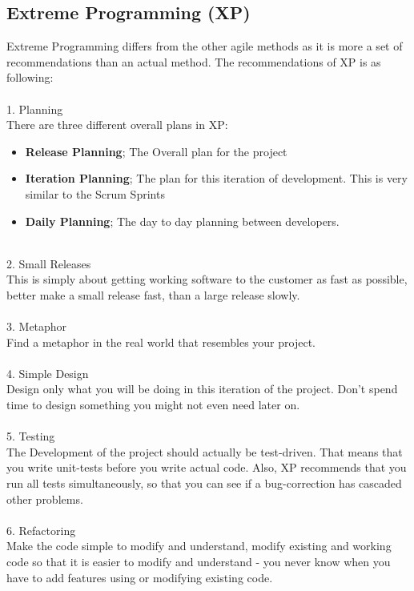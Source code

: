 \subsection{Extreme Programming (XP)}
Extreme Programming differs from the other agile methods as it is more a set of recommendations than an actual method. The recommendations of XP is as following:\\
\ \\
1. Planning\\
There are three different overall plans in XP:
\begin{itemize}
	\item \textbf{Release Planning}; The Overall plan for the project
	\item \textbf{Iteration Planning}; The plan for this iteration of development. This is very similar to the Scrum Sprints
	\item \textbf{Daily Planning}; The day to day planning between developers.
\end{itemize}
\ \\
2. Small Releases\\
This is simply about getting working software to the customer as fast as possible, better make a small release fast, than a large release slowly.\\
 \\
3. Metaphor\\
Find a metaphor in the real world that resembles your project.\\
 \\
4. Simple Design\\
Design only what you will be doing in this iteration of the project. Don't spend time to design something you might not even need later on.\\
 \\
5. Testing\\
The Development of the project should actually be test-driven. That means that you write unit-tests before you write actual code. Also, XP recommends that you run all tests simultaneously, so that you can see if a bug-correction has cascaded other problems.\\
 \\
6. Refactoring\\
Make the code simple to modify and understand, modify existing and working code so that it is easier to modify and understand - you never know when you have to add features using or modifying existing code.\\
 \\
